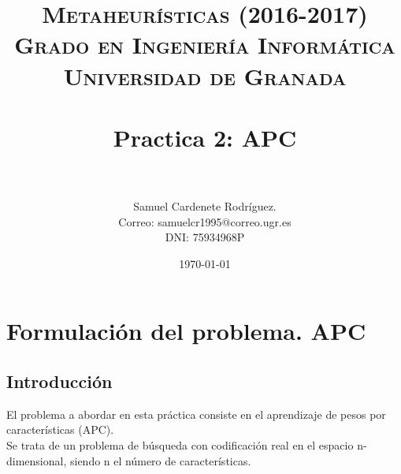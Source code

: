 





\title{	
\normalfont \normalsize 
\textsc{\textbf{Metaheurísticas (2016-2017)} \\ Grado en Ingeniería Informática \\ Universidad de Granada} \\ [25pt] %
\horrule{0.5pt} \\[0.4cm] %
\huge Practica 2: APC \\ %
\horrule{2pt} \\[0.5cm] %
}

\author{Samuel Cardenete Rodríguez.  \\Correo: samuelcr1995@correo.ugr.es \\ DNI: 75934968P} %

\date{\normalsize\today} %




\maketitle %

\newpage %

\tableofcontents %

\listoffigures



\newpage





\section{Formulación del problema. APC}

\subsection{Introducción}
El problema a abordar en esta práctica consiste en el aprendizaje de pesos por características (APC). \\ 
Se trata de un problema de búsqueda con codificación real en el espacio n-dimensional, siendo n el número de características.\\ 

